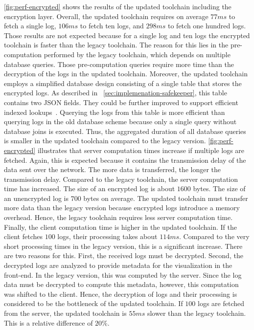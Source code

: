 \documentclass[../main.tex]{subfiles}
\begin{document}
\cref{fig:perf-encrypted} shows the results of the updated toolchain including the encryption layer.
Overall, the updated toolchain requires on average $77ms$ to fetch a single log, $106ms$ to fetch ten logs, and $298ms$ to fetch one hundred logs.
Those results are not expected because for a single log and ten logs the encrypted toolchain is faster than the legacy toolchain.
The reason for this lies in the pre-computation performed by the legacy toolchain, which depends on multiple database queries.
Those pre-computation queries require more time than the decryption of the logs in the updated toolchain.
Moreover, the updated toolchain employs a simplified database design consisting of a single table that stores the encrypted logs.
As described in ~\cref{sec:implemenation-safekeeper}, this table contains two JSON fields.
They could be further improved to support efficient indexed lookups~\cite{Shang2021}.
Querying the logs from this table is more efficient than querying logs in the old database scheme because only a single query without database joins is executed.
Thus, the aggregated duration of all database queries is smaller in the updated toolchain compared to the legacy version.
\cref{fig:perf-encrypted} illustrates that server computation times increase if multiple logs are fetched.
Again, this is expected because it contains the transmission delay of the data sent over the network.
The more data is transferred, the longer the transmission delay.
Compared to the legacy toolchain, the server computation time has increased.
The size of an encrypted log is about $1600$ bytes.
The size of an unencrypted log is $700$ bytes on average.
The updated toolchain must transfer more data than the legacy version because encrypted logs introduce a memory overhead.
Hence, the legacy toolchain requires less server computation time.
Finally, the client computation time is higher in the updated toolchain.
If the client fetches $100$ logs, their processing takes about $114ms$.
Compared to the very short processing times in the legacy version, this is a significant increase.
There are two reasons for this.
First, the received logs must be decrypted.
Second, the decrypted logs are analyzed to provide metadata for the visualization in the front-end.
In the legacy version, this was computed by the server.
Since the log data must be decrypted to compute this metadata, however, this computation was shifted to the client.
Hence, the decryption of logs and their processing is considered to be the bottleneck of the updated toolchain.
If $100$ logs are fetched from the server, the updated toolchain is $55ms$ slower than the legacy toolchain.
This is a relative difference of $20\%$.
\end{document}

